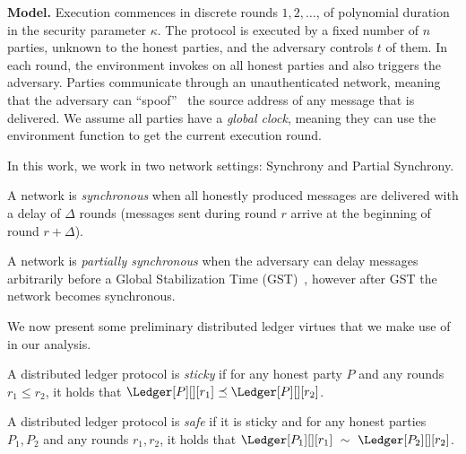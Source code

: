 \noindent
\textbf{Model.}
Execution commences in discrete rounds $1, 2, \ldots$, of polynomial duration in the
security parameter $\kappa$.
The protocol is executed by a fixed number of $n$ parties,
unknown to the honest parties, and the adversary controls $t$ of them. 
In each round, the environment invokes \execute
on all honest parties and also triggers the adversary.
Parties communicate through an unauthenticated network,
meaning that the adversary can ``spoof''~\cite{douceur2002sybil}
the source address of any message that is delivered.
We assume all parties have a \emph{global clock}, meaning
they can use the environment function \now to get the current
execution round.

In this work, we work in two network settings: Synchrony and Partial Synchrony.

\begin{definition}[Synchrony]
  A network is \emph{synchronous} when
  all honestly produced messages are delivered with a delay of $\Delta$ rounds
  (messages sent during round $r$ arrive at the beginning of round $r + \Delta$).
\end{definition}

\begin{definition}
  A network is \emph{partially synchronous} when the adversary can delay
  messages arbitrarily before a Global Stabilization Time (GST)~\cite{dwork1988consensus}, however
  after GST the network becomes synchronous.
\end{definition}

We now present some preliminary distributed ledger virtues
that we make use of in our analysis.

\begin{definition}[Stickiness]
  A distributed ledger protocol is \emph{sticky} if
  for any honest party $P$ and any rounds $r_1 \leq r_2$,
  it holds that $\Ledger[P][][r_1] \preceq \Ledger[P][][r_2]$.
\end{definition}

\begin{definition}[Safety]
  A distributed ledger protocol is \emph{safe} if it is sticky and
  for any honest parties $P_1, P_2$ and any rounds $r_1, r_2$, it holds that
  $\Ledger[P_1][][r_1]~\sim~\Ledger[P_2][][r_2]$. 
\end{definition}

